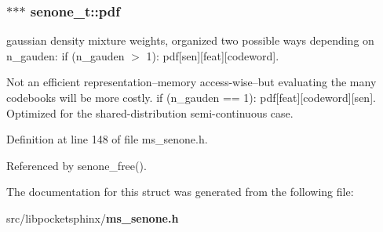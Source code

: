 \subsubsection[{pdf}]{$\ast$$\ast$$\ast$ senone\-\_\-t\-::pdf}\label{structsenone__t_aa7e23dc8a18875bad1c1b9c322f3cad4}


gaussian density mixture weights, organized two possible ways depending on n\-\_\-gauden\-: if (n\-\_\-gauden $>$ 1)\-: pdf[sen][feat][codeword]. 

Not an efficient representation--memory access-\/wise--but evaluating the many codebooks will be more costly. if (n\-\_\-gauden == 1)\-: pdf[feat][codeword][sen]. Optimized for the shared-\/distribution semi-\/continuous case. 

Definition at line 148 of file ms\-\_\-senone.\-h.



Referenced by senone\-\_\-free().



The documentation for this struct was generated from the following file\-:\begin{DoxyCompactItemize}
\item 
src/libpocketsphinx/{\bf ms\-\_\-senone.\-h}\end{DoxyCompactItemize}
